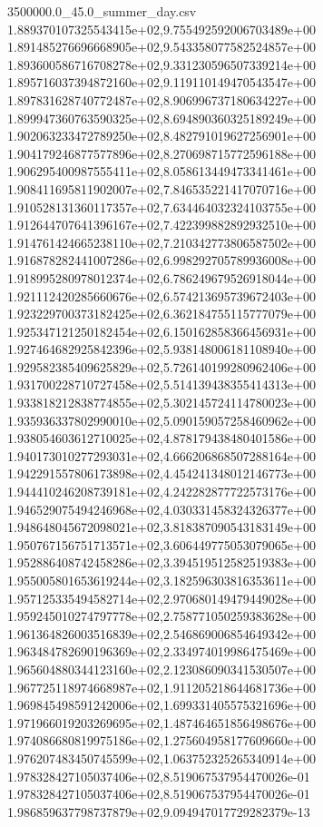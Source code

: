 \begin{filecontents*}{3500000.0_45.0_summer_day.csv}
1.889370107325543415e+02,9.755492592006703489e+00
1.891485276696668905e+02,9.543358077582524857e+00
1.893600586716708278e+02,9.331230596507339214e+00
1.895716037394872160e+02,9.119110149470543547e+00
1.897831628740772487e+02,8.906996737180634227e+00
1.899947360763590325e+02,8.694890360325189249e+00
1.902063233472789250e+02,8.482791019627256901e+00
1.904179246877577896e+02,8.270698715772596188e+00
1.906295400987555411e+02,8.058613449473341461e+00
1.908411695811902007e+02,7.846535221417070716e+00
1.910528131360117357e+02,7.634464032324103755e+00
1.912644707641396167e+02,7.422399882892932510e+00
1.914761424665238110e+02,7.210342773806587502e+00
1.916878282441007286e+02,6.998292705789936008e+00
1.918995280978012374e+02,6.786249679526918044e+00
1.921112420285660676e+02,6.574213695739672403e+00
1.923229700373182425e+02,6.362184755115777079e+00
1.925347121250182454e+02,6.150162858366456931e+00
1.927464682925842396e+02,5.938148006181108940e+00
1.929582385409625829e+02,5.726140199280962406e+00
1.931700228710727458e+02,5.514139438355414313e+00
1.933818212838774855e+02,5.302145724114780023e+00
1.935936337802990010e+02,5.090159057258460962e+00
1.938054603612710025e+02,4.878179438480401586e+00
1.940173010277293031e+02,4.666206868507288164e+00
1.942291557806173898e+02,4.454241348012146773e+00
1.944410246208739181e+02,4.242282877722573176e+00
1.946529075494246968e+02,4.030331458324326377e+00
1.948648045672098021e+02,3.818387090543183149e+00
1.950767156751713571e+02,3.606449775053079065e+00
1.952886408742458286e+02,3.394519512582519383e+00
1.955005801653619244e+02,3.182596303816353611e+00
1.957125335494582714e+02,2.970680149479449028e+00
1.959245010274797778e+02,2.758771050259383628e+00
1.961364826003516839e+02,2.546869006854649342e+00
1.963484782690196369e+02,2.334974019986475469e+00
1.965604880344123160e+02,2.123086090341530507e+00
1.967725118974668987e+02,1.911205218644681736e+00
1.969845498591242006e+02,1.699331405575321696e+00
1.971966019203269695e+02,1.487464651856498676e+00
1.974086680819975186e+02,1.275604958177609660e+00
1.976207483450745599e+02,1.063752325265340914e+00
1.978328427105037406e+02,8.519067537954470026e-01
1.978328427105037406e+02,8.519067537954470026e-01
1.986859637798737879e+02,9.094947017729282379e-13
\end{filecontents*}

